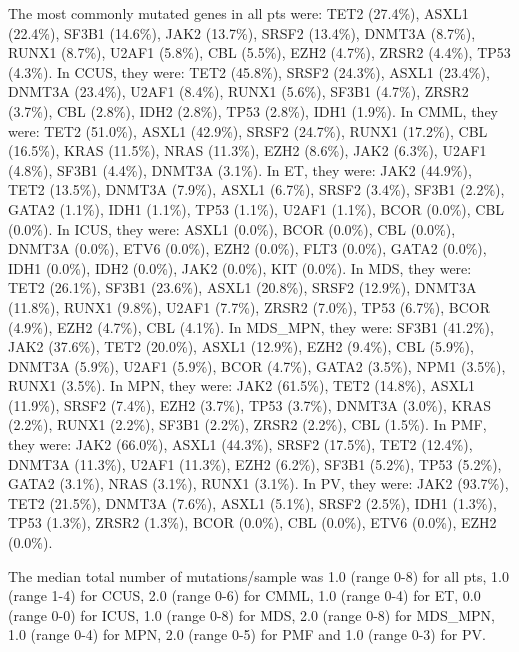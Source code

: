 The most commonly mutated genes in all pts were: TET2 (27.4\%), ASXL1 (22.4\%), SF3B1 (14.6\%), JAK2 (13.7\%), SRSF2 (13.4\%), DNMT3A (8.7\%), RUNX1 (8.7\%), U2AF1 (5.8\%), CBL (5.5\%), EZH2 (4.7\%), ZRSR2 (4.4\%), TP53 (4.3\%). In CCUS, they were: TET2 (45.8\%), SRSF2 (24.3\%), ASXL1 (23.4\%), DNMT3A (23.4\%), U2AF1 (8.4\%), RUNX1 (5.6\%), SF3B1 (4.7\%), ZRSR2 (3.7\%), CBL (2.8\%), IDH2 (2.8\%), TP53 (2.8\%), IDH1 (1.9\%). In CMML, they were: TET2 (51.0\%), ASXL1 (42.9\%), SRSF2 (24.7\%), RUNX1 (17.2\%), CBL (16.5\%), KRAS (11.5\%), NRAS (11.3\%), EZH2 (8.6\%), JAK2 (6.3\%), U2AF1 (4.8\%), SF3B1 (4.4\%), DNMT3A (3.1\%). In ET, they were: JAK2 (44.9\%), TET2 (13.5\%), DNMT3A (7.9\%), ASXL1 (6.7\%), SRSF2 (3.4\%), SF3B1 (2.2\%), GATA2 (1.1\%), IDH1 (1.1\%), TP53 (1.1\%), U2AF1 (1.1\%), BCOR (0.0\%), CBL (0.0\%). In ICUS, they were: ASXL1 (0.0\%), BCOR (0.0\%), CBL (0.0\%), DNMT3A (0.0\%), ETV6 (0.0\%), EZH2 (0.0\%), FLT3 (0.0\%), GATA2 (0.0\%), IDH1 (0.0\%), IDH2 (0.0\%), JAK2 (0.0\%), KIT (0.0\%). In MDS, they were: TET2 (26.1\%), SF3B1 (23.6\%), ASXL1 (20.8\%), SRSF2 (12.9\%), DNMT3A (11.8\%), RUNX1 (9.8\%), U2AF1 (7.7\%), ZRSR2 (7.0\%), TP53 (6.7\%), BCOR (4.9\%), EZH2 (4.7\%), CBL (4.1\%). In MDS_MPN, they were: SF3B1 (41.2\%), JAK2 (37.6\%), TET2 (20.0\%), ASXL1 (12.9\%), EZH2 (9.4\%), CBL (5.9\%), DNMT3A (5.9\%), U2AF1 (5.9\%), BCOR (4.7\%), GATA2 (3.5\%), NPM1 (3.5\%), RUNX1 (3.5\%). In MPN, they were: JAK2 (61.5\%), TET2 (14.8\%), ASXL1 (11.9\%), SRSF2 (7.4\%), EZH2 (3.7\%), TP53 (3.7\%), DNMT3A (3.0\%), KRAS (2.2\%), RUNX1 (2.2\%), SF3B1 (2.2\%), ZRSR2 (2.2\%), CBL (1.5\%). In PMF, they were: JAK2 (66.0\%), ASXL1 (44.3\%), SRSF2 (17.5\%), TET2 (12.4\%), DNMT3A (11.3\%), U2AF1 (11.3\%), EZH2 (6.2\%), SF3B1 (5.2\%), TP53 (5.2\%), GATA2 (3.1\%), NRAS (3.1\%), RUNX1 (3.1\%). In PV, they were: JAK2 (93.7\%), TET2 (21.5\%), DNMT3A (7.6\%), ASXL1 (5.1\%), SRSF2 (2.5\%), IDH1 (1.3\%), TP53 (1.3\%), ZRSR2 (1.3\%), BCOR (0.0\%), CBL (0.0\%), ETV6 (0.0\%), EZH2 (0.0\%).

The median total number of mutations/sample was 1.0 (range 0-8) for all pts, 1.0 (range 1-4) for CCUS, 2.0 (range 0-6) for CMML, 1.0 (range 0-4) for ET, 0.0 (range 0-0) for ICUS, 1.0 (range 0-8) for MDS, 2.0 (range 0-8) for MDS_MPN, 1.0 (range 0-4) for MPN, 2.0 (range 0-5) for PMF and 1.0 (range 0-3) for PV.


